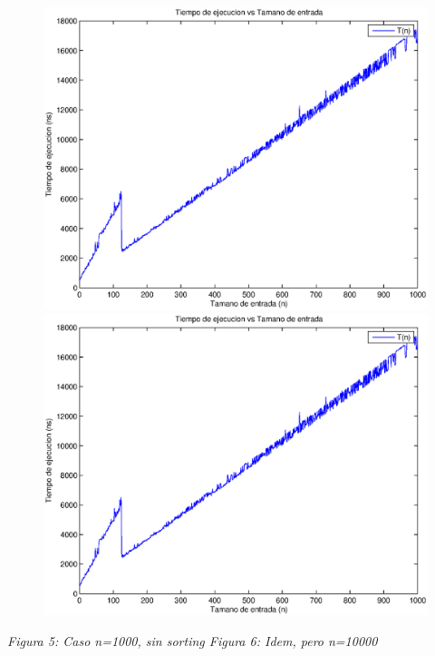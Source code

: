 \begin{figure}[H]
    \includegraphics[width=0.5\linewidth]{problema1/graficos/problema1_aleatoria_1000.eps}
    \includegraphics[width=0.5\linewidth]{problema1/graficos/problema1_aleatoria_1000.eps}
\end{figure}
\emph{\hspace{2cm}Figura 5: Caso n=1000, sin sorting \hspace{2,5cm}Figura 6: Idem, pero n=10000}
